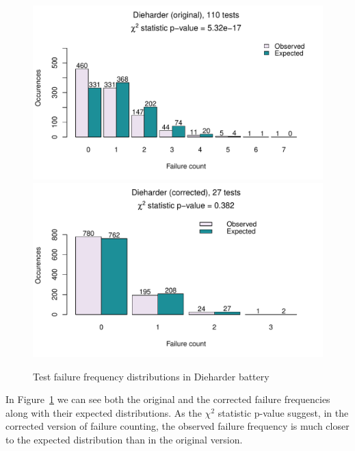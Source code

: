 \documentclass[
  digital,  	%
  color,		%
  oneside,   	%
  12pt,
  nocover,
  notable,
  nolof,
  nolot,
]{fithesis3}
\theoremstyle{definition}
\theoremstyle{remark}
\begin{document}
\begin{figure}[H]
\begin{nomar}
\centering

\includegraphics[width=.42\paperwidth]{figures/dieharder-orig.pdf} 
\includegraphics[width=.42\paperwidth]{figures/dieharder-corr.pdf} 

\end{nomar}
\caption{Test failure frequency distributions in Dieharder battery}
\label{fig:corr_vs_orig_hist}
\end{figure}

In Figure~\ref{fig:corr_vs_orig_hist} we can see both the original and the corrected failure frequencies along with their expected distributions. As the $\chi^2$ statistic p-value suggest, in the corrected version of failure counting, the observed failure frequency is much closer to the expected distribution than in the original version.
\end{document}
